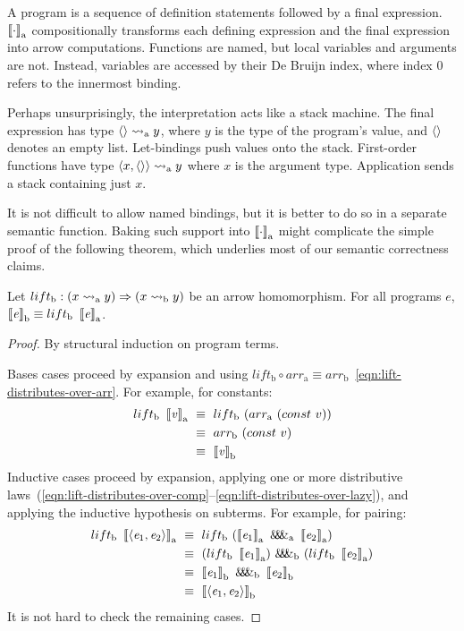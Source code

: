 \documentclass[preprint]{sigplanconf}
\newcommand{\arrow}{\rightsquigarrow}
\newcommand{\arrowlift}{\ensuremath{lift}}
\newcommand{\arrowarr}{\ensuremath{arr}}
\newcommand{\arrowpair}{\ensuremath{\mathit{\&\mspace{-7.5mu}\&\mspace{-7.5mu}\&}}}
\newcommand{\gen}{_\mathrm{a}}
\newcommand{\genb}{_\mathrm{b}}
\begin{document}
A program is a sequence of definition statements followed by a final expression.
$\meaningof{\cdot}\gen$ compositionally transforms each defining expression and the final expression into arrow computations.
Functions are named, but local variables and arguments are not.
Instead, variables are accessed by their De Bruijn index, where index $0$ refers to the innermost binding.

Perhaps unsurprisingly, the interpretation acts like a stack machine.
The final expression has type $\pair{} \arrow\gen y$, where $y$ is the type of the program's value, and $\langle{}\rangle$ denotes an empty list.
Let-bindings push values onto the stack.
First-order functions have type $\pair{x,\pair{}} \arrow\gen y$ where $x$ is the argument type.
Application sends a stack containing just $x$.

It is not difficult to allow named bindings, but it is better to do so in a separate semantic function.
Baking such support into $\meaningof{\cdot}\gen$ might complicate the simple proof of the following theorem, which underlies most of our semantic correctness claims.

\begin{theorem}
Let $\arrowlift\genb : (x \arrow\gen y) \tto (x \arrow\genb y)$ be an arrow homomorphism.
For all programs $\mathit{e}$, $\meaningof{\mathit{e}}\genb \equiv \arrowlift\genb~\meaningof{\mathit{e}}\gen$.
\label{thm:homomorphism-implies-correct}
\end{theorem}
\begin{proof}
By structural induction on program terms.

Bases cases proceed by expansion and using $\arrowlift\genb \circ \arrowarr\gen \equiv \arrowarr\genb$~\eqref{eqn:lift-distributes-over-arr}. For example, for constants:
\begin{align*}
	\arrowlift\genb~\meaningof{\mathit{v}}\gen
		&\ \equiv\ \arrowlift\genb~(\arrowarr\gen~(const~v)) \\
		&\ \equiv\ \arrowarr\genb~(const~v) \\
		&\ \equiv\ \meaningof{\mathit{v}}\genb
\end{align*}
Inductive cases proceed by expansion, applying one or more distributive laws~(\ref{eqn:lift-distributes-over-comp}--\ref{eqn:lift-distributes-over-lazy}), and applying the inductive hypothesis on subterms.
For example, for pairing:
\begin{align*}
	\arrowlift\genb~\meaningof{\pair{\mathit{e}_1,\mathit{e}_2}}\gen
		&\ \equiv\ \arrowlift\genb~(\meaningof{\mathit{e}_1}\gen~\arrowpair\gen~\meaningof{\mathit{e}_2}\gen) \\
		&\ \equiv\ (\arrowlift\genb~\meaningof{\mathit{e}_1}\gen)~\arrowpair\genb~(\arrowlift\genb~\meaningof{\mathit{e}_2}\gen) \\
		&\ \equiv\ \meaningof{\mathit{e}_1}\genb~\arrowpair\genb~\meaningof{\mathit{e}_2}\genb \\
		&\ \equiv\ \meaningof{\pair{\mathit{e}_1,\mathit{e}_2}}\genb
\end{align*}
It is not hard to check the remaining cases.
\end{proof}
\end{document}
